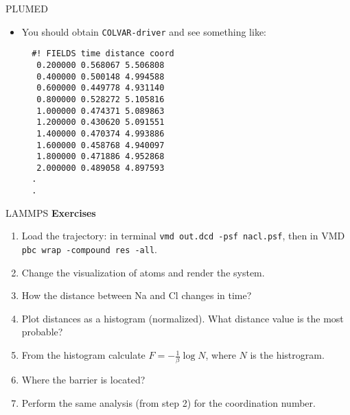\documentclass[10pt]{beamer}
\begin{document}
\begin{frame}[fragile]{PLUMED}
  \begin{itemize}
    \setlength\itemsep{1em}
    \item You should obtain \texttt{COLVAR-driver} and see something like:
    \begin{lstlisting}
  #! FIELDS time distance coord
   0.200000 0.568067 5.506808
   0.400000 0.500148 4.994588
   0.600000 0.449778 4.931140
   0.800000 0.528272 5.105816
   1.000000 0.474371 5.089863
   1.200000 0.430620 5.091551
   1.400000 0.470374 4.993886
   1.600000 0.458768 4.940097
   1.800000 0.471886 4.952868
   2.000000 0.489058 4.897593
  .
  .
    \end{lstlisting}
  \end{itemize}
\end{frame}

\begin{frame}{LAMMPS}
  \textbf{Exercises}\\[0.2cm]
  \begin{enumerate}
    \setlength\itemsep{1em}
    \item Load the trajectory: in terminal \texttt{vmd out.dcd -psf nacl.psf}, then in VMD \texttt{pbc wrap -compound res -all}.

    \item Change the visualization of atoms and render the system.

    \item How the distance between Na and Cl changes in time?

    \item Plot distances as a histogram (normalized). What distance value is the most probable?

    \item From the histogram calculate $F=-\frac{1}{\beta}\log N$, where $N$ is the histrogram.

    \item Where the barrier is located?

    \item Perform the same analysis (from step 2) for the coordination number.
  \end{enumerate}
\end{frame}
\end{document}
